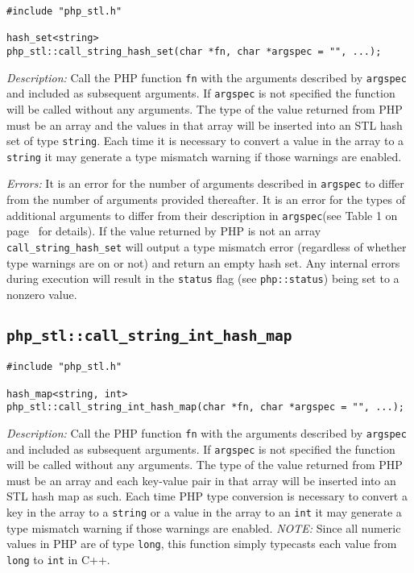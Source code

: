 \documentclass[11pt,titlepage]{article}
\begin{document}
\begin{verbatim}
#include "php_stl.h"

hash_set<string> 
php_stl::call_string_hash_set(char *fn, char *argspec = "", ...);
\end{verbatim}

\emph{Description:} Call the PHP function \verb|fn| with the arguments described by \verb|argspec| and included as subsequent arguments. If \verb|argspec| is not specified the function will be called without any arguments. The type of the value returned from PHP must be an array and the values in that array will be inserted into an STL hash set of type \verb|string|. Each time it is necessary to convert a value in the array to a \verb|string| it may generate a type mismatch warning if those warnings are enabled.

\emph{Errors:} It is an error for the number of arguments described in \verb|argspec| to differ from the number of arguments provided thereafter. It is an error for the types of additional arguments to differ from their description in \verb|argspec|(see Table 1 on page~\pageref{Table1} for details). If the value returned by PHP is not an array \verb|call_string_hash_set| will output a type mismatch error (regardless of whether type warnings are on or not) and return an empty hash set. Any internal errors during execution will result in the \verb|status| flag (see \verb|php::status|) being set to a nonzero value.


\subsection{\texttt{php\_stl::call\_string\_int\_hash\_map}}

\begin{verbatim}
#include "php_stl.h"

hash_map<string, int> 
php_stl::call_string_int_hash_map(char *fn, char *argspec = "", ...);
\end{verbatim}

\emph{Description:} Call the PHP function \verb|fn| with the arguments described by \verb|argspec| and included as subsequent arguments. If \verb|argspec| is not specified the function will be called without any arguments. The type of the value returned from PHP must be an array and each key-value pair in that array will be inserted into an STL hash map as such. Each time PHP type conversion is necessary to convert a key in the array to a \verb|string| or a value in the array to an \verb|int| it may generate a type mismatch warning if those warnings are enabled. \emph{NOTE:} Since all numeric values in PHP are of type \verb|long|, this function simply typecasts each value from \verb|long| to \verb|int| in C++.
\end{document}
